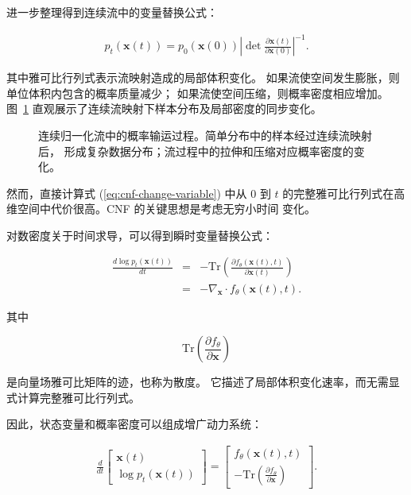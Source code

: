 \documentclass[UTF8,a4paper,zihao=-4,oneside,openany]{ctexbook}
\makeatletter
\newcommand{\AMLFigure}[2][0.96\linewidth]{%
  \begingroup
  \let\AtBeginDocument\@gobble
  \endgroup
}
\makeatother
\begin{document}
进一步整理得到连续流中的变量替换公式：

\begin{eqnarray}
p_t(\mathbf{x}(t))
=
p_0(\mathbf{x}(0))
\left|
\det
\frac{\partial\mathbf{x}(t)}
{\partial\mathbf{x}(0)}
\right|^{-1}.
\label{eq:cnf-change-variable}
\end{eqnarray}

其中雅可比行列式表示流映射造成的局部体积变化。
如果流使空间发生膨胀，则单位体积内包含的概率质量减少；
如果流使空间压缩，则概率密度相应增加。图~\ref{fig:cnf-example}
直观展示了连续流映射下样本分布及局部密度的同步变化。

\begin{figure}[!t]
\centering
\AMLFigure{figure-cnf-example}
\caption{连续归一化流中的概率输运过程。简单分布中的样本经过连续流映射后，
形成复杂数据分布；流过程中的拉伸和压缩对应概率密度的变化。}
\label{fig:cnf-example}
\end{figure}


然而，直接计算式 (\ref{eq:cnf-change-variable}) 中从 $0$ 到 $t$
的完整雅可比行列式在高维空间中代价很高。CNF 的关键思想是考虑无穷小时间
变化。

对数密度关于时间求导，可以得到瞬时变量替换公式：

\begin{eqnarray}
\frac{d\log p_t(\mathbf{x}(t))}{dt}
&=&
-\mathrm{Tr}
\left(
\frac{\partial f_{\theta}(\mathbf{x}(t),t)}
{\partial\mathbf{x}(t)}
\right)
\nonumber\\
&=&
-\nabla_{\mathbf{x}}\cdot f_{\theta}(\mathbf{x}(t),t).
\label{eq:cnf-instantaneous}
\end{eqnarray}

其中

\[
\mathrm{Tr}
\left(
\frac{\partial f_{\theta}}
{\partial\mathbf{x}}
\right)
\]

是向量场雅可比矩阵的迹，也称为散度。
它描述了局部体积变化速率，而无需显式计算完整雅可比行列式。

因此，状态变量和概率密度可以组成增广动力系统：

\begin{eqnarray}
\frac{d}{dt}
\begin{bmatrix}
\mathbf{x}(t)\\
\log p_t(\mathbf{x}(t))
\end{bmatrix}
=
\begin{bmatrix}
f_{\theta}(\mathbf{x}(t),t)
\\
-\mathrm{Tr}
(
\frac{\partial f_{\theta}}
{\partial\mathbf{x}}
)
\end{bmatrix}.
\label{eq:cnf-augmented}
\end{eqnarray}
\end{document}
